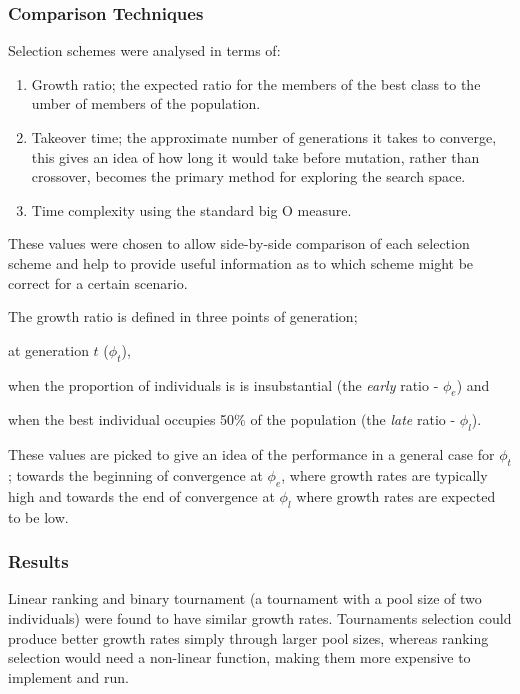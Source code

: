 \documentclass[10pt, a4paper]{article}
\begin{document}

\subsubsection{Comparison Techniques} 
Selection schemes were analysed in terms of:

\begin{enumerate}
\item Growth ratio; the expected ratio for the members of the best class to the
umber of members of the population.
\item Takeover time; the approximate number of generations it takes
to converge, this gives an idea of how long it would take before mutation,
rather than crossover, becomes the primary method for exploring the search
space. 
\item Time complexity using the standard big O measure.
\end{enumerate}

These values were chosen to allow side-by-side comparison of each selection
scheme and help to provide useful information as to which scheme might be
correct for a certain scenario.

The growth ratio is defined in three points of generation;
\begin{inparaenum}[1\upshape)]
\item at generation $t$ ($\phi_t$),
\item when the proportion of individuals is is insubstantial (the \textit{early}
      ratio - $\phi_e$) and
\item when the best individual occupies 50\% of the population (the
      \textit{late} ratio - $\phi_l$).
\end{inparaenum}

These values are picked to give an idea of the performance in a general case for
$\phi_t$; towards the beginning of convergence at $\phi_e$, where growth rates
are typically high and towards the end of convergence at $\phi_l$ where growth
rates are expected to be low.

\subsubsection{Results} 
Linear ranking and binary tournament (a tournament with a pool size of two
individuals) were found to have similar growth rates. Tournaments selection
could produce better growth rates simply through larger pool sizes, whereas
ranking selection would need a non-linear function, making them more expensive
to implement and run.
\end{document}
